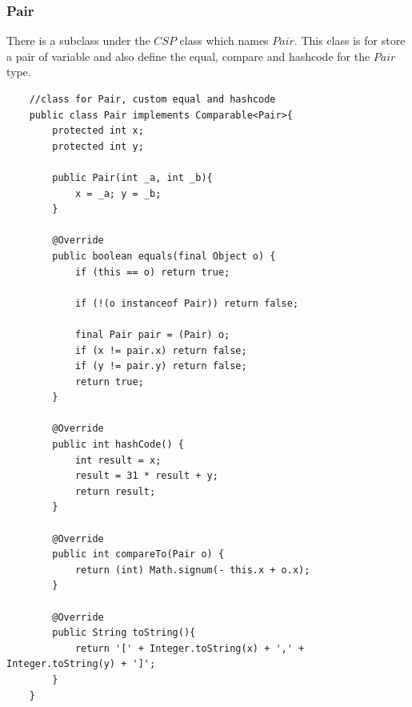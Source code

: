 \documentclass{article}
\begin{document}
\subsubsection{Pair}
There is a subclass under the $CSP$ class which names $Pair$. This class is for store a pair of variable and also define the equal, compare and hashcode for the $Pair$ type.
\begin{lstlisting}
	//class for Pair, custom equal and hashcode
	public class Pair implements Comparable<Pair>{
		protected int x;
		protected int y;
		
		public Pair(int _a, int _b){
			x = _a; y = _b;
		}
		
		@Override
	    public boolean equals(final Object o) {
	        if (this == o) return true;
	        
	        if (!(o instanceof Pair)) return false;

	        final Pair pair = (Pair) o;
	        if (x != pair.x) return false;
	        if (y != pair.y) return false;
	        return true;
	    }

	    @Override
	    public int hashCode() {
	        int result = x;
	        result = 31 * result + y;
	        return result;
	    }
	    
	    @Override
		public int compareTo(Pair o) {
			return (int) Math.signum(- this.x + o.x);
		}
	    
	    @Override
	    public String toString(){
	    	return '[' + Integer.toString(x) + ',' + Integer.toString(y) + ']';
	    }
	}
\end{lstlisting}
\end{document}
